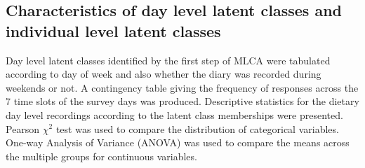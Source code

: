 %
%
%



\subsection{Characteristics of day level latent classes and individual level latent classes}\vspace{-0.3cm}


Day level latent classes identified by the first step of MLCA were tabulated according to day of week and also whether the diary was recorded during weekends or not. A contingency table giving the frequency of responses across the 7 time slots of the survey days was produced. Descriptive statistics for the dietary day level recordings according to the latent class memberships were presented. Pearson $\chi^2$ test was used to compare the distribution of categorical variables. One-way Analysis of Variance (ANOVA) was used to compare the means across the multiple groups for continuous variables.

